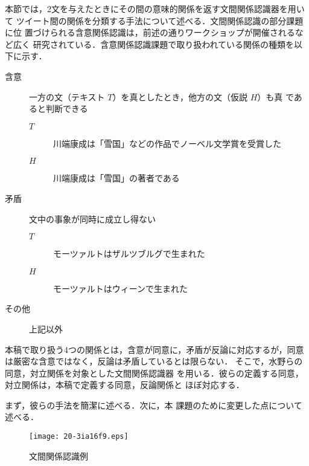 \documentclass[japanese]{jnlp_1.4}
\newcommand{\addspan}[1]{}
\begin{document}
本節では，2文を与えたときにその間の意味的関係を返す文間関係認識器を用いて
ツイート間の関係を分類する手法について述べる．文間関係認識の部分課題に位
置づけられる含意関係認識は，前述の通りワークショップが開催されるなど広く
研究されている．含意関係認識課題で取り扱われている関係の種類を以下に示す．
\begin{description}
 \item[含意] 一方の文（テキスト $T$）を真としたとき，他方の文（仮説 $H$）も真
	    であると判断できる\addspan{文対}
	    \begin{description}
	     \item[$T$] 川端康成は「雪国」などの作品でノーベル文学賞を受賞した
	     \item[$H$] 川端康成は「雪国」の著者である
	    \end{description}
 \item[矛盾] 文中の事象が同時に成立し得ない\addspan{文対}
	    \begin{description}
	     \item[$T$] モーツァルトはザルツブルグで生まれた
	     \item[$H$] モーツァルトはウィーンで生まれた
	    \end{description}
 \item[その他] 上記以外\addspan{の文対}
	    \begin{description}
             \item[\addspan{$T$}] \addspan{川端康成は小説家である}
             \item[\addspan{$H$}] \addspan{川端康成は大阪で生まれた}
	    \end{description}
\end{description}

本稿で取り扱う4つの関係とは，含意が同意に，矛盾が反論に対応するが，同意
は厳密な含意ではなく，反論は矛盾しているとは限らない．
そこで，水野ら\cite{水野_2011}の同意，対立関係を対象とした文間関係認識器
を用いる．彼らの定義する同意，対立関係は，本稿で定義する同意，反論関係と
ほぼ対応する．\addspan{疑問関係は取り扱えないため，同意，反論，その他の3種類の関
係に分類する．}

まず，\addspan{図\ref{fig:srr_example}を用いて，}彼らの手法を簡潔に述べる．次に，本
課題のために変更した点について述べる．

\begin{figure}[b]
 \centering
   \texttt{[image: 20-3ia16f9.eps]}
 \caption{文間関係認識例}
 \label{fig:srr_example}
\end{figure}
\end{document}
